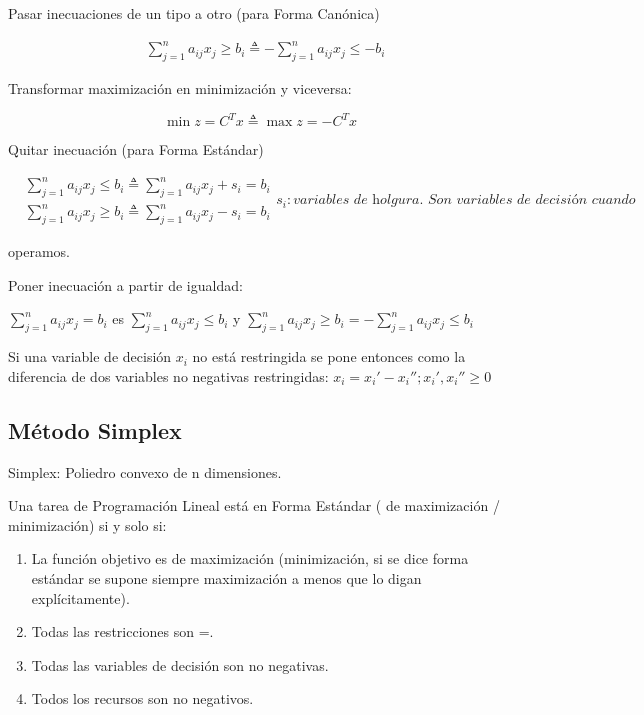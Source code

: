 \documentclass[12pt, twoside, openright]{report} %
\begin{document}
  
  Pasar inecuaciones de un tipo a otro (para Forma Canónica)

  $$\begin{aligned}  &\sum_{j=1}^{n} a_{i j} x_{j} \geqslant b_{i} \triangleq -\sum_{j=1}^{n} a_{i j} x_{j}\leq -b_{i}  \end{aligned}$$

	Transformar maximización en minimización y viceversa:

	
	$$\min z = C^{T}x \triangleq \max z =- C^{T}x$$

  Quitar inecuación (para Forma Estándar)

  $$\begin{aligned}  &\sum_{j=1}^{n} a_{i j} x_{j} \leqslant b_{i} \triangleq \sum_{j=1}^{n} a_{i j} x_{j}+s_{i}=b_{i}\\  &\sum_{j=1}^{n} a_{i j} x_{j} \geqslant b_{i} \triangleq \sum_{j=1}^{n} a_{i j} x_{j}-s_{i}=b_{i}  \end{aligned}s_i: \textit{variables de holgura. Son variables de decisión cuando}$$
  
  operamos.

  
Poner inecuación a partir de igualdad:

  \(\sum_{j=1}^{n} a_{i j} x_{j} = b_{i}\) es
  \(\sum_{j=1}^{n} a_{i j} x_{j} \leqslant b_{i}\) y
  \(\sum_{j=1}^{n} a_{i j} x_{j} \geq b_{i}= -\sum_{j=1}^{n} a_{i j} x_{j} \leqslant b_{i}\)

  Si una variable de decisión \(x_i\) no está restringida se pone
  entonces como la diferencia de dos variables no negativas
  restringidas: \(x_i=x_i'-x_i''; x_i',x_i'' \geq 0\)

  
\subsection{Método Simplex}

Simplex: Poliedro convexo de n dimensiones.

    Una tarea de Programación Lineal está en Forma Estándar ( de
    maximización / minimización) si y solo si:

	
  \begin{enumerate}
  \def\labelenumi{\arabic{enumi}.}

  \item
    La función objetivo es de maximización (minimización, si se dice
    forma estándar se supone siempre maximización a menos que lo digan
    explícitamente).

    
  
    \item
      Todas las restricciones son =.
    \item
      Todas las variables de decisión son no negativas.
    \item
      Todos los recursos son no negativos.
  \end{enumerate}
\end{document}
